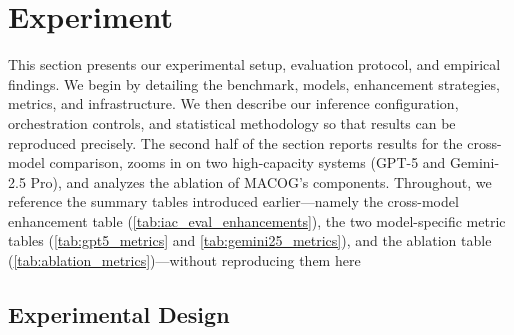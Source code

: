 \documentclass[acmsmall,screen,review,anonymous]{acmart}
\begin{document}








\section{Experiment}
\label{sec:experiment}

This section presents our experimental setup, evaluation protocol, and empirical findings. We begin by detailing the benchmark, models, enhancement strategies, metrics, and infrastructure. We then describe our inference configuration, orchestration controls, and statistical methodology so that results can be reproduced precisely. The second half of the section reports results for the cross-model comparison, zooms in on two high-capacity systems (GPT-5 and Gemini-2.5 Pro), and analyzes the ablation of MACOG’s components. Throughout, we reference the summary tables introduced earlier—namely the cross-model enhancement table (\autoref{tab:iac_eval_enhancements}), the two model-specific metric tables (\autoref{tab:gpt5_metrics} and \autoref{tab:gemini25_metrics}), and the ablation table (\autoref{tab:ablation_metrics})—without reproducing them here

\subsection{Experimental Design}
\label{sec:exp-design}
\end{document}
